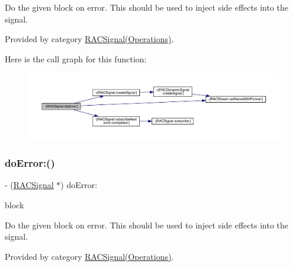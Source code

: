 Do the given block on {\ttfamily error}. This should be used to inject side effects into the signal. 

Provided by category \mbox{\hyperlink{category_r_a_c_signal_07_operations_08_ac97a1fc7c03123a75746f2602b7444b4}{R\+A\+C\+Signal(\+Operations)}}.

Here is the call graph for this function\+:\nopagebreak
\begin{figure}[H]
\begin{center}
\leavevmode
\includegraphics[width=350pt]{interface_r_a_c_signal_ac97a1fc7c03123a75746f2602b7444b4_cgraph}
\end{center}
\end{figure}
\mbox{\label{interface_r_a_c_signal_ac97a1fc7c03123a75746f2602b7444b4}} 
\subsubsection{\texorpdfstring{do\+Error\+:()}{doError:()}\hspace{0.1cm}{\footnotesize\ttfamily [2/3]}}
{\footnotesize\ttfamily -\/ (\mbox{\hyperlink{interface_r_a_c_signal}{R\+A\+C\+Signal}} $\ast$) do\+Error\+: \begin{DoxyParamCaption}\item[{(void($^\wedge$)(N\+S\+Error $\ast$error))}]{block }\end{DoxyParamCaption}}

Do the given block on {\ttfamily error}. This should be used to inject side effects into the signal. 

Provided by category \mbox{\hyperlink{category_r_a_c_signal_07_operations_08_ac97a1fc7c03123a75746f2602b7444b4}{R\+A\+C\+Signal(\+Operations)}}.

\mbox{\label{interface_r_a_c_signal_ac97a1fc7c03123a75746f2602b7444b4}} 

